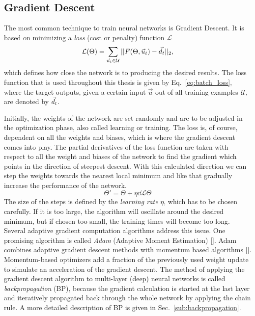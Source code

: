 \subsection{Gradient Descent}
\label{sub:gradient_descent}

The most common technique to train neural networks is Gradient Descent.
It is based on minimizing a \emph{loss} (cost or penalty) function $\mathcal{L}$
\begin{equation}
  \label{eq:batch_loss}
  \mathcal{L}(\Theta) = \sum_{\vec{u}_t \in \mathcal{U}} 
                        ||F(\Theta, \vec{u}_t) - \vec{d}_t||_2,
\end{equation}
which defines how close the network is to producing the
desired results.  The loss function that is used throughout this thesis is
given by Eq.~\ref{eq:batch_loss}, where the target outputs, given a certain
input $\vec{u}$ out of all training examples $\mathcal{U}$, are denoted by
$\vec{d}_t$.  

Initially, the weights of the network are set randomly and are to be adjusted
in the optimization phase, also called learning or training.  The loss is, of
course, dependent on all the weights and biases, which is where the gradient
descent comes into play.  The partial derivatives of the loss function are
taken with respect to all the weight and biases of the network to find the
gradient which points in the direction of steepest descent.  With this
calculated direction we can step the weights towards the nearest local minimum
and like that gradually increase the performance of the network.
\begin{equation}
  \label{eq:gradient_descent}
  \Theta' = \Theta + \eta \dd{\mathcal{L}}{\Theta}
\end{equation}
The size of the steps is defined by the \emph{learning rate} $\eta$, which has
to be chosen carefully.  If it is too large, the algorithm will oscillate
around the desired minimum, but if chosen too small, the training times will
become too long.  Several adaptive gradient computation algorithms address this
issue. One promising algorithm is called \emph{Adam} (Adaptive Moment
Estimation) [\cite{ADAM}]. Adam combines adaptive gradient descent methods with
momentum based algorithms [\cite{ADAM}]. Momentum-based optimizers add a fraction
of the previously used weight update to simulate an acceleration of the
gradient descent.  The method of applying the gradient descent algorithm to
multi-layer (deep) neural networks is called \emph{backpropagation} (BP),
because the gradient calculation is started at the last layer and iteratively
propagated back through the whole network by applying the chain rule. A more
detailed description of BP is given in Sec.~\ref{sub:backpropagation}.

